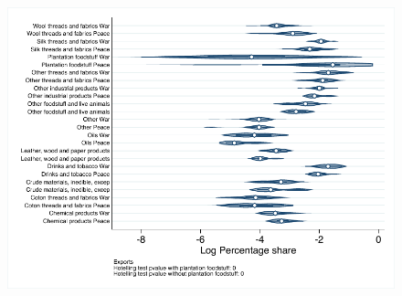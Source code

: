 \documentclass[12pt,a4paper,notitlepage,english]{article}
\begin{document}
\begin{figure}
\includegraphics[scale=.63]{peace_war_distribution_X}
\end{figure}


\end{document}
